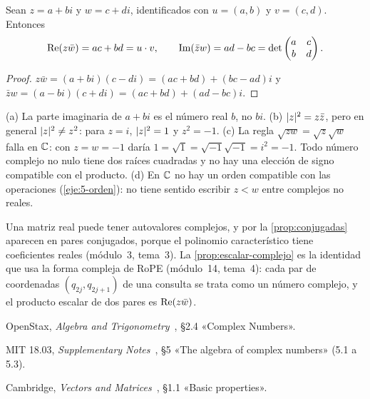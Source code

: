\begin{proposicion}\label{prop:escalar-complejo}
Sean $z=a+bi$ y $w=c+di$, identificados con $u=(a,b)$ y $v=(c,d)$. Entonces
\[
\operatorname{Re}(z\bar w)=ac+bd=u\cdot v,\qquad \operatorname{Im}(\bar z w)=ad-bc=\det\begin{pmatrix}a&c\\ b&d\end{pmatrix}.
\]
\end{proposicion}

\begin{proof}
$z\bar w=(a+bi)(c-di)=(ac+bd)+(bc-ad)i$ y $\bar zw=(a-bi)(c+di)=(ac+bd)+(ad-bc)i$.
\end{proof}

\begin{observacion}
(a) La parte imaginaria de $a+bi$ es el número real $b$, no $bi$. (b) $\lvert z\rvert^{2}=z\bar z$, pero en general $\lvert z\rvert^{2}\ne z^{2}$: para $z=i$, $\lvert z\rvert^{2}=1$ y $z^{2}=-1$. (c) La regla $\sqrt{zw}=\sqrt z\sqrt w$ falla en $\mathbb{C}$: con $z=w=-1$ daría $1=\sqrt1=\sqrt{-1}\sqrt{-1}=i^{2}=-1$. Todo número complejo no nulo tiene dos raíces cuadradas y no hay una elección de signo compatible con el producto. (d) En $\mathbb{C}$ no hay un orden compatible con las operaciones (\cref{eje:5-orden}): no tiene sentido escribir $z<w$ entre complejos no reales.
\end{observacion}

\begin{observacion}
Una matriz real puede tener autovalores complejos, y por la \cref{prop:conjugadas} aparecen en pares conjugados, porque el polinomio característico tiene coeficientes reales (módulo~3, tema~3). La \cref{prop:escalar-complejo} es la identidad que usa la forma compleja de RoPE (módulo~14, tema~4): cada par de coordenadas $(q_{2j},q_{2j+1})$ de una consulta se trata como un número complejo, y el producto escalar de dos pares es $\operatorname{Re}(z\bar w)$.
\end{observacion}

\begin{lecturas}
\item OpenStax, \emph{Algebra and Trigonometry}~\cite{osat}, §2.4 «Complex Numbers».
\item MIT 18.03, \emph{Supplementary Notes}~\cite{mit1803}, §5 «The algebra of complex numbers» (5.1 a 5.3).
\item Cambridge, \emph{Vectors and Matrices}~\cite{cambvm}, §1.1 «Basic properties».
\end{lecturas}


